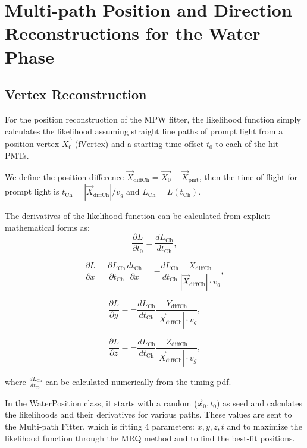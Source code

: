 \section{Multi-path Position and Direction Reconstructions for the Water Phase}

\subsection{Vertex Reconstruction}
For the position reconstruction of the MPW fitter, the likelihood function simply calculates the likelihood assuming straight line paths of prompt light from a position vertex $\vec{X_0}$ ($\mathrm{fVertex}$) and a starting time offset $t_0$ to each of the hit PMTs. 

We define the position difference $\vec{X}_{{\mathrm{diffCh}}} = \vec{X_0}-\vec{X}_{\mathrm{pmt}}$, then the time of flight for prompt light is  $t_{\mathrm{Ch}}=|\vec{X}_{{\mathrm{diffCh}}}|/v_g$ and $L_{\mathrm{Ch}}=L(t_{\mathrm{Ch}})$.

The derivatives of the likelihood function can be calculated from explicit mathematical forms as:
\[
\frac{\partial L}{\partial t_0}=\frac{dL_{\mathrm{Ch}}}{dt_{\mathrm{Ch}}},
\]

\[
\frac{\partial L}{\partial x}=\frac{\partial L_{\mathrm{Ch}}}{\partial t_{\mathrm{Ch}}}\frac{dt_{\mathrm{Ch}}}{\partial x}=-\frac{dL_{\mathrm{Ch}}}{dt_{\mathrm{Ch}}}\frac{X_{{\mathrm{diffCh}}}}{|\vec{X}_{{\mathrm{diffCh}}}|\cdot v_g},
\]

\[
\frac{\partial L}{\partial y}=-\frac{dL_{\mathrm{Ch}}}{dt_{\mathrm{Ch}}}\frac{Y_{{\mathrm{diffCh}}}}{|\vec{X}_{{\mathrm{diffCh}}}|\cdot v_g},
\]

\[
\frac{\partial L}{\partial z}=-\frac{dL_{\mathrm{Ch}}}{dt_{\mathrm{Ch}}}\frac{Z_{{\mathrm{diffCh}}}}{|\vec{X}_{{\mathrm{diffCh}}}|\cdot v_g},
\]

where $\frac{dL_{\mathrm{Ch}}}{dt_{\mathrm{Ch}}}$ can be calculated numerically from the timing pdf. 

In the WaterPosition class, it starts with a random ($\vec{x}_0,t_0$) as seed and calculates the likelihoods and their derivatives for various paths. These values are sent to the Multi-path Fitter, which is fitting 4 parameters: $x,y,z,t$ and to maximize the likelihood function through the MRQ method and to find the best-fit positions.


